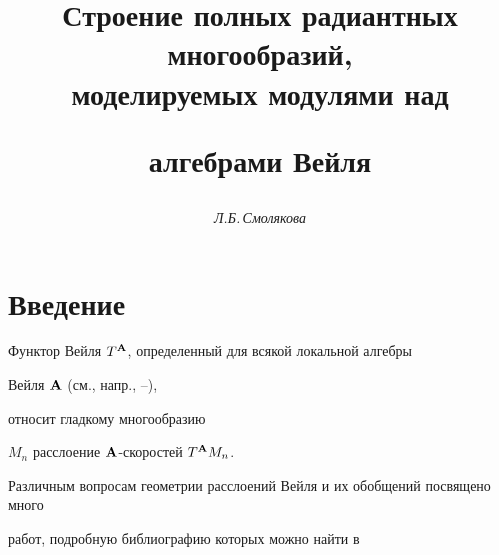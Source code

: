 










\author{\it Л.Б.\,Смолякова}




\title{Строение полных радиантных многообразий,\\ моделируемых модулями над


алгебрами Вейля}





\date{}




\pagestyle{plain} %







\maketitle


\label{begin}











\section{Введение}





Функтор Вейля $T^{\bold A}$, определенный для всякой локальной алгебры


Вейля ${\bold A}$ (см., напр., \cite{Shir3}--\cite{VSh31}),


относит гладкому многообразию


$M_n$ расслоение $\bold A$-скоростей $T^{\bold A}M_n$.


Различным вопросам геометрии расслоений Вейля и их обобщений посвящено много


работ, подробную библиографию которых можно найти в


